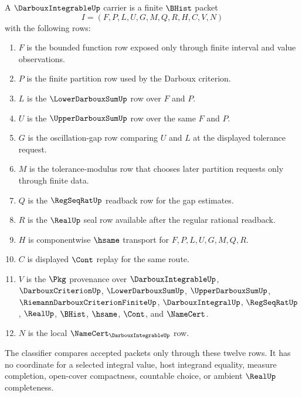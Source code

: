 \begin{definition}\label{def:darboux-integrable-carrier}
A $\DarbouxIntegrableUp$ carrier is a finite $\BHist$ packet
$$
I=(F,P,L,U,G,M,Q,R,H,C,V,N)
$$
with the following rows:
\begin{enumerate}
  \item $F$ is the bounded function row exposed only through finite interval and value observations.
  \item $P$ is the finite partition row used by the Darboux criterion.
  \item $L$ is the $\LowerDarbouxSumUp$ row over $F$ and $P$.
  \item $U$ is the $\UpperDarbouxSumUp$ row over the same $F$ and $P$.
  \item $G$ is the oscillation-gap row comparing $U$ and $L$ at the displayed tolerance request.
  \item $M$ is the tolerance-modulus row that chooses later partition requests only through finite data.
  \item $Q$ is the $\RegSeqRatUp$ readback row for the gap estimates.
  \item $R$ is the $\RealUp$ seal row available after the regular rational readback.
  \item $H$ is componentwise $\hsame$ transport for $F,P,L,U,G,M,Q,R$.
  \item $C$ is displayed $\Cont$ replay for the same route.
  \item $V$ is the $\Pkg$ provenance over $\DarbouxIntegrableUp$, $\DarbouxCriterionUp$, $\LowerDarbouxSumUp$, $\UpperDarbouxSumUp$, $\RiemannDarbouxCriterionFiniteUp$, $\DarbouxIntegralUp$, $\RegSeqRatUp$, $\RealUp$, $\BHist$, $\hsame$, $\Cont$, and $\NameCert$.
  \item $N$ is the local $\NameCert_{\DarbouxIntegrableUp}$ row.
\end{enumerate}
The classifier compares accepted packets only through these twelve rows. It has no coordinate for a selected integral value, host integrand equality, measure completion, open-cover compactness, countable choice, or ambient $\RealUp$ completeness.
\end{definition}

